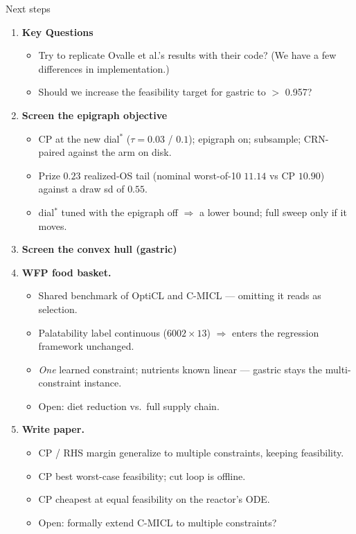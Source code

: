 \documentclass{beamer}
\begin{document}
\begin{frame}{Next steps}
    \footnotesize
    \begin{enumerate}
        \item \textbf{Key Questions}
            \begin{itemize}\scriptsize
                  \item Try to replicate Ovalle et al.'s results with their code? (We have a few differences in implementation.)
                  \item Should we increase the feasibility target for gastric to $>$ 0.957?
            \end{itemize}
        \item \textbf{Screen the epigraph objective}
              \begin{itemize}\scriptsize
                  \item CP at the new dial$^\ast$ ($\tau=0.03$ / $0.1$); epigraph
                        on; subsample; CRN-paired against the arm on disk.
                  \item Prize $0.23$ realized-OS tail (nominal worst-of-10 $11.14$
                        vs CP $10.90$) against a draw sd of $0.55$.
                  \item dial$^\ast$ tuned with the epigraph off $\Rightarrow$ a
                        lower bound; full sweep only if it moves.
              \end{itemize}
        \item \textbf{Screen the convex hull (gastric)}
        \item \textbf{WFP food basket.}
              \begin{itemize}\scriptsize
                  \item Shared benchmark of OptiCL and C-MICL --- omitting it reads
                        as selection.
                  \item Palatability label continuous ($6002\times13$) $\Rightarrow$
                        enters the regression framework unchanged.
                  \item \emph{One} learned constraint; nutrients known linear ---
                        gastric stays the multi-constraint instance.
                  \item Open: diet reduction vs.\ full supply chain.
              \end{itemize}
        \item \textbf{Write paper.}
              \begin{itemize}\scriptsize
                  \item CP / RHS margin generalize to multiple constraints, keeping
                        feasibility.
                  \item CP best worst-case feasibility; cut loop is offline.
                  \item CP cheapest at equal feasibility on the reactor's ODE.
                  \item Open: formally extend C-MICL to multiple constraints?
              \end{itemize}
    \end{enumerate}
\end{frame}
\end{document}
